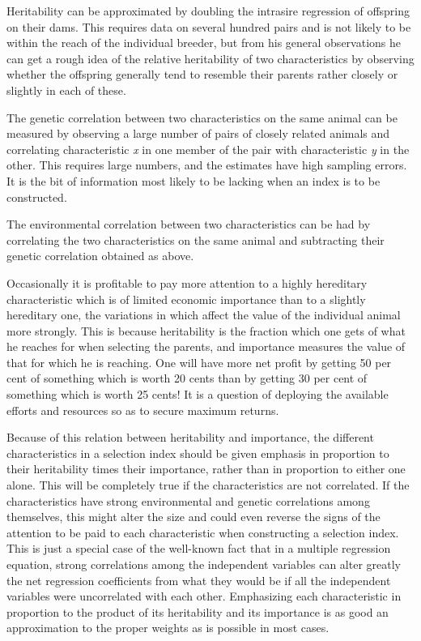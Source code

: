 Heritability can be approximated by doubling the intrasire regression
of offspring on their dams. This requires data on several hundred
pairs and is not likely to be within the reach of the individual breeder,
but from his general observations he can get a rough idea of the relative
heritability of two characteristics by observing whether the offspring
generally tend to resemble their parents rather closely or slightly
in each of these.

The genetic correlation between two characteristics on the same animal
can be measured by observing a large number of pairs of closely
related animals and correlating characteristic \textit{x} in one member of the
pair with characteristic \textit{y} in the other. This requires large numbers, and
the estimates have high sampling errors. It is the bit of information
most likely to be lacking when an index is to be constructed.

The environmental correlation between two characteristics can be
had by correlating the two characteristics on the same animal and subtracting
their genetic correlation obtained as above.

Occasionally it is profitable to pay more attention to a highly
hereditary characteristic which is of limited economic importance than
to a slightly hereditary one, the variations in which affect the value of
the individual animal more strongly. This is because heritability is the
fraction which one gets of what he reaches for when selecting the parents,
and importance measures the value of that for which he is reaching.
One will have more net profit by getting 50 per cent of something
which is worth 20 cents than by getting 30 per cent of something which
is worth 25 cents! It is a question of deploying the available efforts and
resources so as to secure maximum returns.

Because of this relation between heritability and importance, the
different characteristics in a selection index should be given emphasis
in proportion to their heritability times their importance, rather than
in proportion to either one alone. This will be completely true if the
characteristics are not correlated. If the characteristics have strong
environmental and genetic correlations among themselves, this might
alter the size and could even reverse the signs of the attention to be paid
to each characteristic when constructing a selection index. This is just a
special case of the well-known fact that in a multiple regression equation,
strong correlations among the independent variables can alter
greatly the net regression coefficients from what they would be if all the
independent variables were uncorrelated with each other. Emphasizing
each characteristic in proportion to the product of its heritability and
its importance is as good an approximation to the proper weights as is
possible in most cases.

